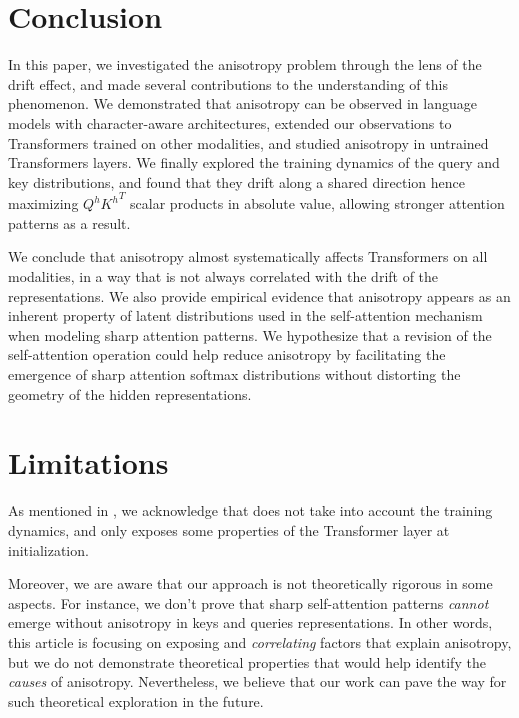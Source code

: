 \section*{Conclusion}
In this paper, we investigated the anisotropy problem through the lens of the drift effect, and made several contributions to the understanding of this phenomenon. We demonstrated that anisotropy can be observed in language models with character-aware architectures, extended our observations to Transformers trained on other modalities, and studied anisotropy in untrained Transformers layers. We finally explored the training dynamics of the query and key distributions, and found that they drift along a shared direction hence maximizing $Q^h{K^h}^T$ scalar products in absolute value, allowing stronger attention patterns as a result.

We conclude that anisotropy almost systematically affects Transformers on all modalities, in a way that is not always correlated with the drift of the representations. We also provide empirical evidence that anisotropy appears as an inherent property of latent distributions used in the self-attention mechanism when modeling sharp attention patterns. We hypothesize that a revision of the self-attention operation could help reduce anisotropy by facilitating the emergence of sharp attention softmax distributions without distorting the geometry of the hidden representations.


\section*{Limitations}
As mentioned in , we acknowledge that  does not take into account the training dynamics, and only exposes some properties of the Transformer layer at initialization.

Moreover, we are aware that our approach is not theoretically rigorous in some aspects. For instance, we don't prove that sharp self-attention patterns \textit{cannot} emerge without anisotropy in keys and queries representations. In other words, this article is focusing on exposing and \textit{correlating} factors that explain anisotropy, but we do not demonstrate theoretical properties that would help identify the \textit{causes} of anisotropy. Nevertheless, we believe that our work can pave the way for such theoretical exploration in the future.

\vspace{2em}

